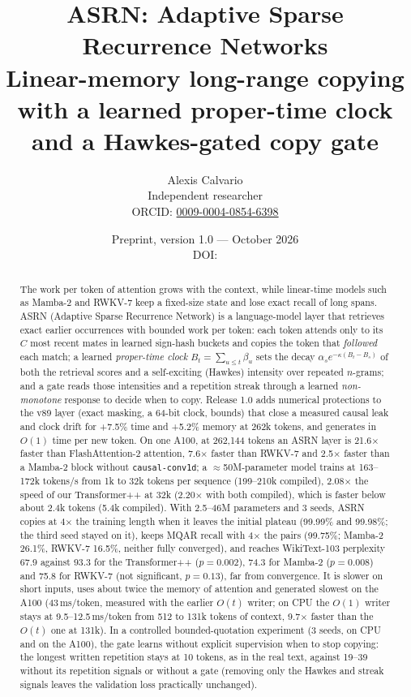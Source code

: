 \documentclass[11pt]{article}
\title{\textbf{ASRN: Adaptive Sparse Recurrence Networks}\\[4pt]
\large Linear-memory long-range copying with a learned proper-time clock\\ and a Hawkes-gated copy gate}
\author{Alexis Calvario\\ \small Independent researcher\\ \small ORCID: \href{https://orcid.org/0009-0004-0854-6398}{0009-0004-0854-6398}}
\date{\small Preprint, version 1.0 --- October 2026%
\ifx\zenododoi\empty\else\\ DOI: \href{https://doi.org/\zenododoi}{\zenododoi}\fi}
\begin{document}
\maketitle

\begin{abstract}
\noindent The work per token of attention grows with the context, while linear-time models such as
Mamba-2 and RWKV-7 keep a fixed-size state and lose exact recall of long spans. ASRN (Adaptive Sparse Recurrence
Network) is a language-model layer that retrieves exact earlier occurrences with bounded work per token: each token
attends only to its $C$ most recent mates in learned sign-hash buckets and copies the token that \emph{followed} each
match; a learned \emph{proper-time clock} $B_t=\sum_{u\le t}\beta_u$ sets the decay $\alpha_s e^{-\kappa(B_t-B_s)}$ of
both the retrieval scores and a self-exciting (Hawkes) intensity over repeated $n$-grams; and a gate reads those
intensities and a repetition streak through a learned \emph{non-monotone} response to decide when to copy. Release 1.0
adds numerical protections to the v89 layer (exact masking, a 64-bit clock, bounds) that close a measured causal leak
and clock drift for +7.5\% time and +5.2\% memory at 262k tokens, and generates in $O(1)$ time per new token. On one
A100, at 262{,}144 tokens an ASRN layer is 21.6$\times$ faster than FlashAttention-2 attention, 7.6$\times$ faster than
RWKV-7 and 2.5$\times$ faster than a Mamba-2 block without \texttt{causal-conv1d}; a $\approx$50M-parameter model trains
at 163--172k tokens/s from 1k to 32k tokens per sequence (199--210k compiled), 2.08$\times$ the speed of our
Transformer++ at 32k (2.20$\times$ with both compiled), which is faster below about 2.4k tokens (5.4k compiled). With
2.5--46M parameters and 3 seeds, ASRN copies at 4$\times$ the training length when it leaves the initial plateau
(99.99\% and 99.98\%; the third seed stayed on it), keeps MQAR recall with 4$\times$ the pairs (99.75\%; Mamba-2 26.1\%,
RWKV-7 16.5\%, neither fully converged), and reaches WikiText-103 perplexity 67.9 against 93.3 for the Transformer++
($p=0.002$), 74.3 for Mamba-2 ($p=0.008$) and 75.8 for RWKV-7 (not significant, $p=0.13$), far from convergence. It is
slower on short inputs, uses about twice the memory of attention and generated slowest on the A100 (43\,ms/token,
measured with the earlier $O(t)$ writer; on CPU the $O(1)$ writer stays at 9.5--12.5\,ms/token from 512 to 131k tokens
of context, 9.7$\times$ faster than the $O(t)$ one at 131k). In a controlled bounded-quotation experiment (3 seeds, on
CPU and on the A100), the gate learns without explicit supervision when to stop copying: the longest written repetition
stays at 10 tokens, as in the real text, against 19--39 without its repetition signals or without a gate (removing only
the Hawkes and streak signals leaves the validation loss practically unchanged).
\end{abstract}
\end{document}
